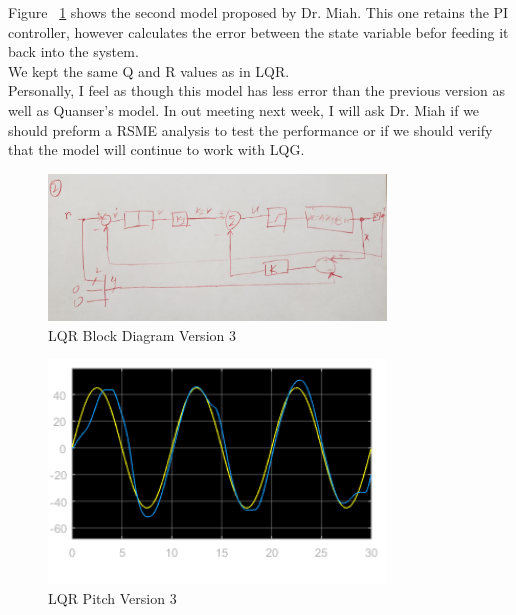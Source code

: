 \documentclass[fontsize=11pt, %
                             paper=letter, %
                             openany, %
                             captions=tableheading,
                             index=totoc,
                             hyperref]{labbook}
\begin{document}
\begin{addmargin}[0cm]{0cm}
\newpage
Figure ~\ref{fig:LQR_V3} shows the second model proposed by Dr. Miah.  This one retains the PI controller, however calculates the error between the state variable befor feeding it back into the system.
\\We kept the same Q and R values as in LQR.
\\Personally, I feel as though this model has less error than the previous version as well as Quanser's model.  In out meeting next week, I will ask Dr. Miah if we should preform a RSME analysis to test the performance or if we should verify that the model will continue to work with LQG.

\begin{figure}[H]
  \centering
  \includegraphics[width=0.8\textwidth]{figs/img/02212019/LQRV3.jpg}
  \caption{LQR Block Diagram Version 3}
  \label{fig:LQR_V3}
\end{figure}

\newpage
\begin{figure}[H]
  \centering
  \includegraphics[width=0.8\textwidth]{figs/img/02212019/LQR_PitchV3.png}
  \caption{LQR Pitch Version 3}
  \label{fig:LQR_PitchV3}
\end{figure}


\end{addmargin}
\end{document}
